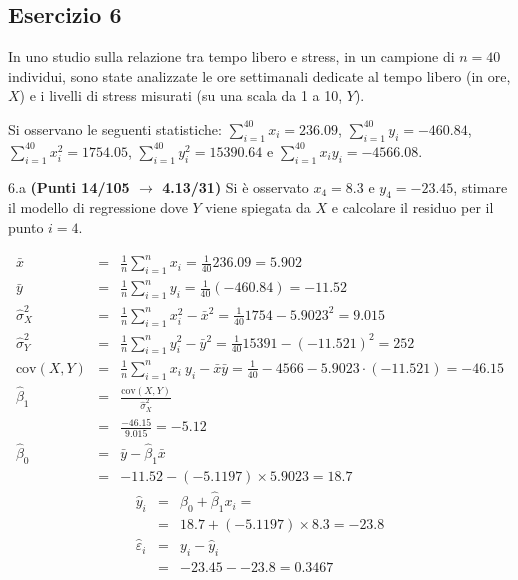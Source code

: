 \documentclass[
  11pt,
]{book}
\theoremstyle{mytheoremstyle}
\theoremstyle{mydefstyle}
\newenvironment{sol}
  {
  \begin{tcolorbox}[enhanced,breakable,arc=0.1mm,boxrule=1pt,colback=white,colframe=iblue,
  title=\bf \fontfamily{lmss}\selectfont \hspace{.5 cm} Soluzione,drop fuzzy shadow]

}{
\end{tcolorbox}
  }
\begin{document}
\subsection{Esercizio 6}\label{esercizio-6-34}

In uno studio sulla relazione tra tempo libero e stress, in un campione di \(n=40\) individui, sono state analizzate le ore settimanali dedicate al tempo libero (in ore, \(X\)) e i livelli di stress misurati (su una scala da 1 a 10, \(Y\)).

Si osservano le seguenti statistiche:
\(\sum_{i=1}^{40}x_i=236.09\), \(\sum_{i=1}^{40}y_i=-460.84\),
\(\sum_{i=1}^{40}x_i^2=1754.05\), \(\sum_{i=1}^{40}y_i^2=15390.64\) e \(\sum_{i=1}^{40}x_iy_i=-4566.08\).

6.a \textbf{(Punti 14/105 \(\rightarrow\) 4.13/31)} Si è osservato \(x_4=8.3\) e \(y_4=-23.45\), stimare il modello di regressione dove \(Y\) viene spiegata da \(X\) e calcolare il residuo per il punto \(i=4\).

\begin{sol}
\begin{eqnarray*}
           \bar x &=&\frac 1 n\sum_{i=1}^n x_i = \frac {1}{ 40 }  236.09 =  5.902 \\
           \bar y &=&\frac 1 n\sum_{i=1}^n y_i = \frac {1}{ 40 }  (-460.84) =  -11.52 \\
           \hat\sigma_X^2&=&\frac 1 n\sum_{i=1}^n x_i^2-\bar x^2=\frac {1}{ 40 }  1754  - 5.9023 ^2= 9.015 \\
           \hat\sigma_Y^2&=&\frac 1 n\sum_{i=1}^n y_i^2-\bar y^2=\frac {1}{ 40 }  15391  - (-11.521) ^2= 252 \\
           \text{cov}(X,Y)&=&\frac 1 n\sum_{i=1}^n x_i~y_i-\bar x\bar y=\frac {1}{ 40 }  -4566 - 5.9023 \cdot (-11.521) = -46.15 \\
           \hat\beta_1 &=& \frac{\text{cov}(X,Y)}{\hat\sigma_X^2} \\
                    &=& \frac{ -46.15 }{ 9.015 }  =  -5.12 \\
           \hat\beta_0 &=& \bar y - \hat\beta_1 \bar x\\
                    &=&  -11.52 - (-5.1197) \times  5.9023 = 18.7 
         \end{eqnarray*}\begin{eqnarray*}
\hat y_i &=&\hat\beta_0+\hat\beta_1 x_i=\\ 
&=& 18.7 + (-5.1197) \times 8.3 = -23.8 \\ 
\hat \varepsilon_i &=& y_i-\hat y_i\\ 
&=& -23.45 - -23.8 = 0.3467  
\end{eqnarray*}

\end{sol}
\end{document}

